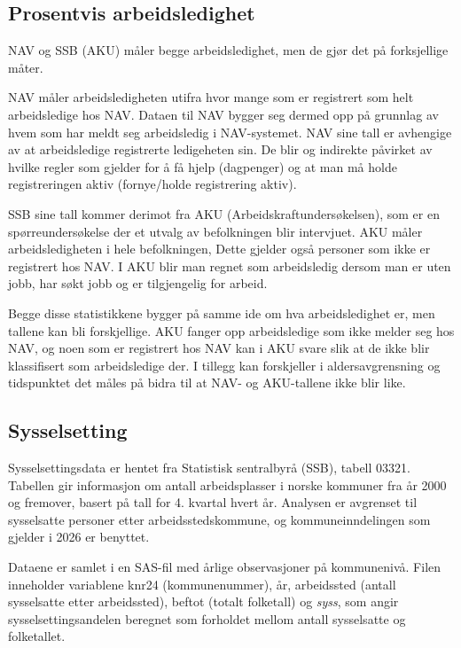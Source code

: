\documentclass[
  norsk,
  letterpaper,
  DIV=11,
  numbers=noendperiod]{scrartcl}
\begin{document}
\subsection{Prosentvis
arbeidsledighet}\label{prosentvis-arbeidsledighet}

NAV og SSB (AKU) måler begge arbeidsledighet, men de gjør det på
forksjellige måter.

NAV måler arbeidsledigheten utifra hvor mange som er registrert som helt
arbeidsledige hos NAV. Dataen til NAV bygger seg dermed opp på grunnlag
av hvem som har meldt seg arbeidsledig i NAV-systemet. NAV sine tall er
avhengige av at arbeidsledige registrerte ledigeheten sin. De blir og
indirekte påvirket av hvilke regler som gjelder for å få hjelp
(dagpenger) og at man må holde registreringen aktiv (fornye/holde
registrering aktiv).

SSB sine tall kommer derimot fra AKU (Arbeidskraftundersøkelsen), som er
en spørreundersøkelse der et utvalg av befolkningen blir intervjuet. AKU
måler arbeidsledigheten i hele befolkningen, Dette gjelder også personer
som ikke er registrert hos NAV. I AKU blir man regnet som arbeidsledig
dersom man er uten jobb, har søkt jobb og er tilgjengelig for arbeid.

Begge disse statistikkene bygger på samme ide om hva arbeidsledighet er,
men tallene kan bli forskjellige. AKU fanger opp arbeidsledige som ikke
melder seg hos NAV, og noen som er registrert hos NAV kan i AKU svare
slik at de ikke blir klassifisert som arbeidsledige der. I tillegg kan
forskjeller i aldersavgrensning og tidspunktet det måles på bidra til at
NAV- og AKU-tallene ikke blir like.

\subsection{Sysselsetting}\label{sysselsetting}

Sysselsettingsdata er hentet fra Statistisk sentralbyrå (SSB), tabell
03321. Tabellen gir informasjon om antall arbeidsplasser i norske
kommuner fra år 2000 og fremover, basert på tall for 4. kvartal hvert
år. Analysen er avgrenset til sysselsatte personer etter
arbeidsstedskommune, og kommuneinndelingen som gjelder i 2026 er
benyttet.

Dataene er samlet i en SAS-fil med årlige observasjoner på kommunenivå.
Filen inneholder variablene knr24 (kommunenummer), år, arbeidssted
(antall sysselsatte etter arbeidssted), beftot (totalt folketall) og
\emph{syss}, som angir sysselsettingsandelen beregnet som forholdet
mellom antall sysselsatte og folketallet.
\end{document}
